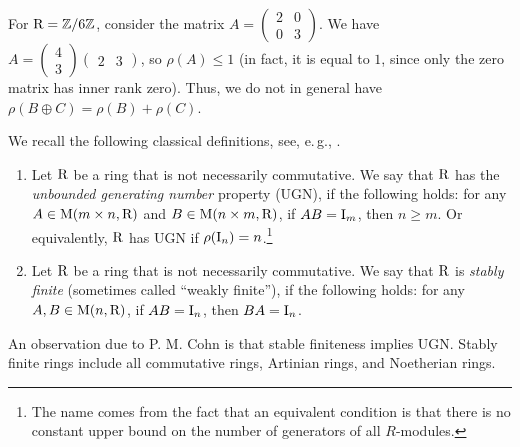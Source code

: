 \begin{example}\label{ex:Z6}
	For $\mathrm{R} = \mathbb{Z}/6\mathbb{Z}$, consider the matrix $A = \begin{pmatrix} 2 & 0 \\ 0 & 3 \end{pmatrix}$. We have $A = \begin{pmatrix} 4 \\ 3 \end{pmatrix} \begin{pmatrix} 2 & 3 \end{pmatrix}$, so $\rho(A) \leq 1$ (in fact, it is equal to $1$, since only the zero matrix has inner rank zero). Thus, we do not in general have $\rho(B \oplus C) = \rho(B) + \rho(C)$. %
\end{example}


We recall the following classical definitions, see, e.\,g., \cite[pp.~6--7]{Coh85}. 
\begin{enumerate}
	\item Let $\mathrm{R}$ be a ring that is not necessarily commutative. We say that $\mathrm{R}$ has the \emph{unbounded generating number} property (UGN), if the following holds: for any $A\in\mathrm{M}(m\times n, \mathrm{R})$ and $B\in\mathrm{M}(n\times m, \mathrm{R})$, if $AB=\mathrm{I}_m$, then $n\geq m$. Or equivalently, %
	$\mathrm{R}$ has UGN if
	$\rho(\mathrm{I}_n)=n$.\footnote{The name comes from the fact that an equivalent condition is that there is no constant upper bound on the number of generators of all $R$-modules.}
	\item Let $\mathrm{R}$ be a ring that is not necessarily commutative. We say that $\mathrm{R}$ is \emph{stably finite} (sometimes called ``weakly finite''), if the following holds: for any $A, B\in \mathrm{M}(n, \mathrm{R})$, if $AB=\mathrm{I}_n$, then $BA=\mathrm{I}_n$.
\end{enumerate}
An observation due to P. M. Cohn \cite{Coh85} is that stable finiteness implies UGN. %
Stably finite rings include all %
commutative rings, Artinian rings, and Noetherian rings.

